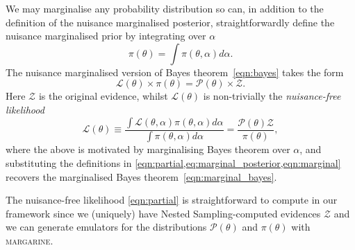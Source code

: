 We may marginalise any probability distribution so can, in addition to the definition of the nuisance marginalised posterior, straightforwardly define the nuisance marginalised prior by integrating over $\alpha$
\begin{equation}
    \pi(\theta) = \int \pi(\theta,\alpha)d\alpha.
    \label{eqn:marginal}
\end{equation}
The nuisance marginalised version of Bayes theorem~\cref{eqn:bayes} takes the form
\begin{equation}
    \mathcal{L}(\theta)\times\pi(\theta) = \mathcal{P}(\theta)\times\mathcal{Z}.
    \label{eqn:marginal_bayes}
\end{equation}
Here $\mathcal{Z}$ is the original evidence, whilst $\mathcal{L}(\theta)$ is non-trivially the \emph{nuisance-free likelihood}
\begin{equation}
    \mathcal{L}(\theta) 
\equiv \frac{\int\mathcal{L}(\theta,\alpha)\pi(\theta,\alpha)d\alpha}{\int \pi(\theta,\alpha)d\alpha} = \frac{\mathcal{P}(\theta)\mathcal{Z}}{\pi(\theta)},
    \label{eqn:partial}
\end{equation}
where the above is motivated by marginalising Bayes theorem over $\alpha$, and substituting the definitions in \cref{eqn:partial,eq:marginal_posterior,eqn:marginal} recovers the marginalised Bayes theorem~\cref{eqn:marginal_bayes}.

The nuisance-free likelihood \cref{eqn:partial} is straightforward to compute in our framework since we (uniquely) have Nested Sampling-computed evidences $\mathcal{Z}$ and we can generate emulators for the distributions $\mathcal{P}(\theta)$ and $\pi(\theta)$ with \textsc{margarine}.

